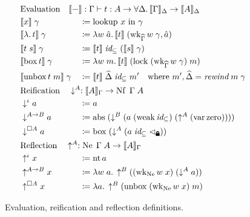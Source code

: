 \documentclass[12pt,twoside,openright]{report}
\numberwithin{equation}{chapter}
\numberwithin{figure}{chapter}
\numberwithin{table}{chapter}
\theoremstyle{definition}\newtheorem{definition}{Definition}
\newcommand{\lock}{\text{\tikz[baseline]{
      \fill[rounded corners=.1ex] (-.75ex,0) rectangle (.75ex,1ex);
      \draw[line width=.3ex] (-.4ex,.5ex) -- ++(0,.75ex) arc (180:0:.4ex) -- ++(0,-.75ex);
}}}
\begin{document}
\begin{figure}
  \centering
  \begin{align*}
    &\mathrlap{\text{Evaluation} \quad \llbracket-\rrbracket : \Gamma \vdash t : A \to \forall\Delta. \, \llbracket\Gamma\rrbracket_\Delta \to \llbracket A \rrbracket_\Delta} &&\\
    &\llbracket x \rrbracket \; \gamma &&\coloneqq \text{lookup } x \text{ in } \gamma \\
    &\llbracket \lambda. \, t \rrbracket \; \gamma &&\coloneqq \lambda w \; \hat a.\, \llbracket t \rrbracket \; (\operatorname{wk}_{\widehat\Gamma} w \; \gamma, \hat a) \\
    &\llbracket t \; s \rrbracket \; \gamma &&\coloneqq \llbracket t \rrbracket \; \textit{id}_\subseteq \; (\llbracket s \rrbracket \; \gamma) \\
    &\llbracket \operatorname{box} t \rrbracket \; \gamma &&\coloneqq \lambda w \; m.\, \llbracket t \rrbracket \; (\operatorname{lock} \; (\operatorname{wk}_{\widehat\Gamma} w \; \gamma) \; m) \\
    &\llbracket \operatorname{unbox} t \; m \rrbracket \; \gamma &&\coloneqq \llbracket t \rrbracket \; \widehat\Delta \; \textit{id}_\subseteq \; m' \quad \text{where } m' , \widehat\Delta = \textit{rewind} \; m \; \gamma \\
    &\mathrlap{\text{Reification} \quad \downarrow^A : \llbracket A \rrbracket_\Gamma \to \operatorname{Nf} \; \Gamma \; A} &&\\
    &\downarrow^\iota a &&\coloneqq a \\
    &\downarrow^{A \to B} a &&\coloneqq \operatorname{abs} \; (\downarrow^B (a \; (\operatorname{weak} \textit{id}_\subseteq) \; (\uparrow^A (\operatorname{var} \operatorname{zero})))) \\
    &\downarrow^{\Box A} a &&\coloneqq \operatorname{box} \; (\downarrow^A (a \; \textit{id}_\subseteq \; \lhd_\lock)) \\
    &\mathrlap{\text{Reflection} \quad \uparrow^A : \operatorname{Ne} \; \Gamma \; A \to \llbracket A \rrbracket_\Gamma} &&\\
    &\uparrow^\iota x &&\coloneqq \operatorname{nt} a \\
    &\uparrow^{A \to B} x &&\coloneqq \lambda w \; a.\, \uparrow^B ((\operatorname{wk}_{\operatorname{Ne}} w \; x) \; (\downarrow^A a)) \\
    &\uparrow^{\Box A} x &&\coloneqq \lambda a.\, \uparrow^B (\operatorname{unbox} \; (\operatorname{wk}_{\operatorname{Ne}} w \; x) \; m)
  \end{align*}
  \caption{Evaluation, reification and reflection definitions. \label{fig:nbe}}
\end{figure}
\end{document}
